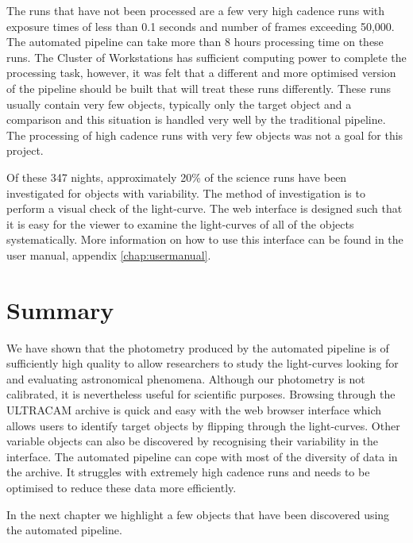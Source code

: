The runs that have not been processed are a few very high cadence runs with exposure times of less than 0.1 seconds and number of frames exceeding 50,000. The automated pipeline can take more than 8 hours processing time on these runs. The Cluster of Workstations has sufficient computing power to complete the processing task, however, it was felt that a different  and more optimised version of the pipeline should be built that will treat these runs differently. These runs usually contain very few objects, typically only the target object and a comparison and this situation is handled very well by the traditional pipeline. The processing of high cadence runs with very few objects was not a goal for this project. 

Of these 347 nights, approximately 20\% of the science runs have been investigated for objects with variability. The method of investigation is to perform a visual check of the light-curve. The web interface is designed such that it is easy for the viewer to examine the light-curves of all of the objects systematically. More information on how to use this interface can be found in the user manual, appendix \ref{chap:usermanual}. 

\section{Summary}
We have shown that the photometry produced by the automated pipeline is of sufficiently high quality to allow researchers to study the light-curves looking for and evaluating astronomical phenomena. Although our photometry is not calibrated, it is nevertheless useful for scientific purposes. Browsing through the ULTRACAM archive is quick and easy with the web browser interface which allows users to identify target objects by flipping through the light-curves. Other variable objects can also be discovered by recognising their variability in the interface. The automated pipeline can cope with most of the diversity of data in the archive. It struggles with extremely high cadence runs and needs to be optimised to reduce these data more efficiently.

In the next chapter we highlight a few objects that have been discovered using the automated pipeline. 
